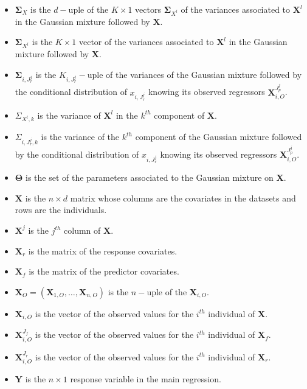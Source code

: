 \documentclass[12pt,a4paper]{report}
\begin{document}
\begin{appendices}
\begin{itemize}
	\item $\boldsymbol{\Sigma}_X$ is the $d-$uple of the $K \times 1 $ vectors $\boldsymbol{\Sigma}_{X^l}$ of the variances associated to $\boldsymbol{X}^l$ in the Gaussian mixture followed by $\boldsymbol{X}$.
	\item $\boldsymbol{\Sigma}_{X^l}$ is the $K \times 1 $ vector of the variances associated to $\boldsymbol{X}^l$ in the Gaussian mixture followed by $\boldsymbol{X}$.
	\item $\boldsymbol{\Sigma}_{i,J_r^j}$ is the $K_{i,J_r^j}-$uple of the variances of the Gaussian mixture followed by the conditional distribution of $x_{i,J_r^j}$ knowing its observed regressors $\boldsymbol{X}_{i,O}^{J_p^j}$.	
	\item $\Sigma_{X^l,k}$ is the variance of $\boldsymbol{X}^l$ in the $k^{th}$ component of $\boldsymbol{X}$.
	\item $\Sigma_{i,J_r^j,k}$ is the variance of the $k^{th}$ component of the Gaussian mixture followed by the conditional distribution of $x_{i,J_r^j}$ knowing its observed regressors $\boldsymbol{X}_{i,O}^{J_p^j}$.
	\item $\boldsymbol{\Theta}$ is the set of the parameters associated to the Gaussian mixture on $\boldsymbol{X}$.	
	\item $\boldsymbol{X}$ is the $n\times d$ matrix whose columns are the covariates in the datasets and rows are the individuals.
	\item $\boldsymbol{X}^j$ is the $j^{th}$ column of $\boldsymbol{X}$.
	\item $\boldsymbol{X}_r$ is the matrix of the response covariates.
	\item $\boldsymbol{X}_f$ is the matrix of the predictor covariates.
	\item $\boldsymbol{X}_O=(\boldsymbol{X}_{1,O},\dots,\boldsymbol{X}_{n,O})$ is the $n-$uple of the $\boldsymbol{X}_{i,O}$.
	\item $\boldsymbol{X}_{i,O}$ is the vector of the observed values for the  $i^{th}$ individual of $\boldsymbol{X}$.
	\item $\boldsymbol{X}_{i,O}^{J_f}$ is the vector of the observed values for the  $i^{th}$ individual of $\boldsymbol{X}_f$.
	\item $\boldsymbol{X}_{i,O}^{J_r}$ is the vector of the observed values for the  $i^{th}$ individual of $\boldsymbol{X}_r$.
	\item $\boldsymbol{Y}$ is the $n\times 1$ response variable in the main regression.
\end{itemize}

	\end{appendices}
\end{document}
